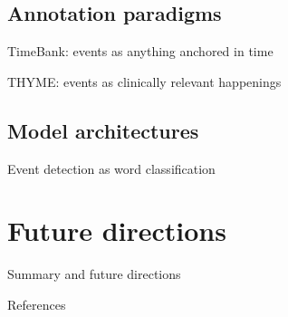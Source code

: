 \documentclass[12pt,compress]{beamer}
\begin{document}
\subsection{Annotation paradigms}


\begin{frame}{TimeBank: events as anything anchored in time}
\end{frame}


\begin{frame}{THYME: events as clinically relevant happenings}
\end{frame}




\subsection{Model architectures}

\begin{frame}{Event detection as word classification}
\end{frame}


\section{Future directions}


\begin{frame}{Summary and future directions}
\end{frame}


\begin{frame}[allowframebreaks]{References}
\printbibliography
\end{frame}
\end{document}
